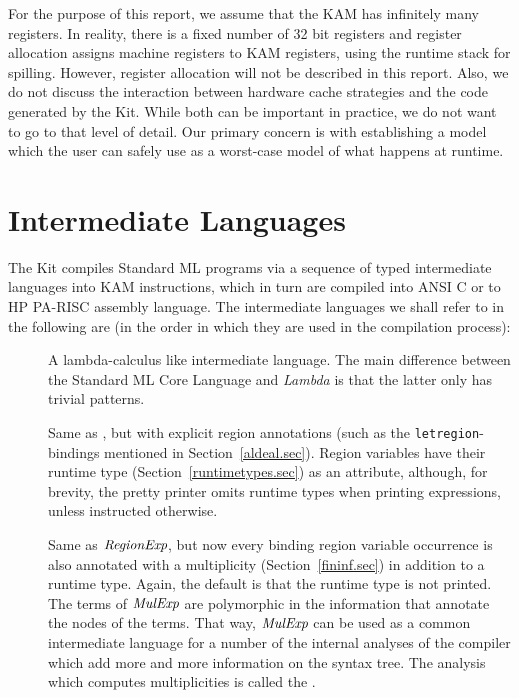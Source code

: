 \documentclass[12pt]{book}
\begin{document}
For the purpose of this report,
we assume that the KAM has infinitely many registers.
In reality, there is a fixed number of 32 bit registers and
register allocation assigns machine registers to KAM registers, using the runtime
stack for spilling. However, register allocation will not be described in this report.
Also, we do not discuss the interaction between hardware cache strategies and
the code generated by the Kit. While both can be important in practice, we do not want
to go to that level of detail. Our primary concern is with establishing a model which
the user can safely use as a worst-case model of what happens at runtime.

\section{Intermediate Languages}
The Kit compiles Standard ML programs via a sequence of typed intermediate 
languages into  KAM instructions, which in turn are compiled into ANSI C or to HP 
PA-RISC assembly language.
The intermediate languages
we shall refer to in the following are (in the order in which they are used in the
compilation process):
\begin{description}
\item[\Lam] A lambda-calculus like intermediate language. The main difference between
  the Standard ML Core Language and {\it Lambda} is that the latter only has trivial patterns.
\item[\RegExp] Same as \Lam, 
but with explicit region annotations (such as the {\tt letregion}-bindings
mentioned in Section~\ref{aldeal.sec}). Region variables have their runtime type (Section~\ref{runtimetypes.sec})
as an attribute, although, for brevity, the pretty printer omits runtime types when printing expressions, 
unless instructed otherwise.
\item[\MulExp] Same as $\hbox{\it RegionExp}$, but now every binding region variable occurrence
is also annotated with a multiplicity (Section~\ref{fininf.sec}) in addition to a runtime type.
Again, the default is that the runtime type is not printed. The terms of $\hbox{\it MulExp}$ are polymorphic 
in the information that annotate the nodes of the terms. That way, $\hbox{\it MulExp}$ can be used
as a common intermediate language for a number of the internal analyses of the compiler which
add more and more information on the syntax tree.
The analysis which computes multiplicities is called the .
\end{description}
\end{document}
